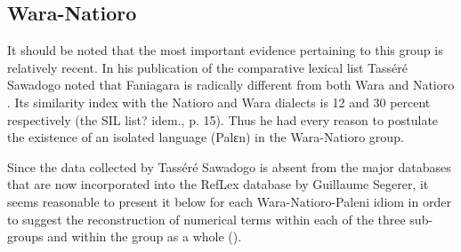 \subsection{Wara-Natioro}%
It should be noted that the most important evidence pertaining to this group is relatively recent. In his publication of the comparative lexical list Tasséré Sawadogo noted that Faniagara is radically different from both Wara and Natioro \citep{Sawadogo2002}. Its similarity index with the Natioro and Wara dialects is 12 and 30 percent respectively (the SIL list? idem., p. 15). Thus he had every reason to postulate the existence of an isolated language (Palɛn) in the Wara-Natioro group. 

Since the data collected by Tasséré Sawadogo is absent from the major databases that are now incorporated into the RefLex database by Guillaume Segerer, it seems reasonable to present it below for each Wara-Natioro-Paleni idiom in order to suggest the reconstruction of numerical terms within each of the three sub-groups and within the group as a whole ().

